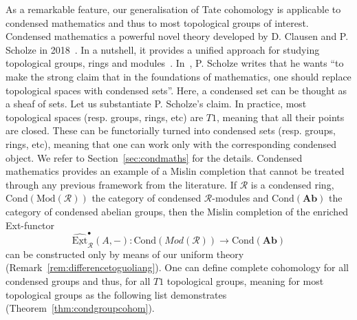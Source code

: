 \documentclass[12pt,a4paper]{article}
\numberwithin{equation}{section}
\theoremstyle{nonumberplain}
\begin{document}
As a remarkable feature, our generalisation of Tate cohomology is applicable to condensed mathematics and thus to most topological groups of interest. Condensed mathematics a powerful novel theory developed by D.\! Clausen and P.\! Scholze in 2018~\cite{sch19}. In a nutshell, it provides a unified approach for studying topological groups, rings and modules~\cite[p.~6]{sch19}. In~\cite{sch20}, P.\! Scholze writes that he wants ``to make the strong claim that in the foundations of mathematics, one should replace topological spaces with condensed sets''. Here, a condensed set can be thought as a sheaf of sets. Let us substantiate P.\! Scholze's claim. In practice, most topological spaces (resp.\! groups, rings, etc) are $T1$, meaning that all their points are closed. These can be functorially turned into condensed sets (resp.\! groups, rings, etc), meaning that one can work only with the corresponding condensed object. We refer to Section~\ref{sec:condmaths} for the details. Condensed mathematics provides an example of a Mislin completion that cannot be treated through any previous framework from the literature. If $\mathcal{R}$ is a condensed ring, $\mathrm{Cond}(\mathrm{Mod}(\mathcal{R}))$ the category of condensed $\mathcal{R}$-modules and $\mathrm{Cond}(\mathbf{Ab})$ the category of condensed abelian groups, then the  Mislin completion of the enriched Ext-functor
\[ \underline{\widehat{\mathrm{Ext}}}_{\mathcal{R}}^{\bullet}(A, -): \mathrm{Cond}(Mod(\mathcal{R})) \rightarrow \mathrm{Cond}(\mathbf{Ab}) \]
can be constructed only by means of our uniform theory (Remark~\ref{rem:differencetoguoliang}). One can define complete cohomology for all condensed groups and thus, for all $T1$ topological groups, meaning for most topological groups as the following list demonstrates (Theorem~\ref{thm:condgroupcohom}).
\end{document}
